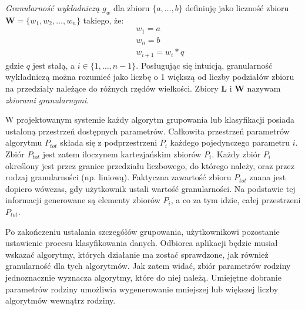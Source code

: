 \documentclass[../thesis.tex]{subfiles}
\begin{document}
\textit{Granularność wykładniczą} $g_w$ dla zbioru $\{a, \ldots, b\}$ definiuję jako liczność zbioru $\textbf{W} = \{w_1, w_2, \ldots, w_n\}$ takiego, że:
\begin{eqnarray*}
&& w_1 = a \\
&& w_n = b \\
&& w_{i+1} = w_i * q
\end{eqnarray*}
gdzie $q$ jest stałą, a $i \in \{1, \ldots, n-1\}$. Posługując się intuicją, granularność wykładniczą można rozumieć jako liczbę o 1 większą od liczby podziałów zbioru na przedziały należące do różnych rzędów wielkości. Zbiory $\textbf{L}$ i $\textbf{W}$ nazywam \textit{zbiorami granularnymi}.

W projektowanym systemie każdy algorytm grupowania lub klasyfikacji posiada ustaloną przestrzeń dostępnych parametrów. Całkowita przestrzeń parametrów algorytmu $P_{tot}$ składa się z podprzestrzeni $P_i$ każdego pojedynczego parametru $i$. Zbiór $P_{tot}$ jest zatem iloczynem kartezjańskim zbiorów $P_i$. Każdy zbiór $P_i$ określony jest przez granice przedziału liczbowego, do którego należy, oraz przez rodzaj granularności (np. liniową). Faktyczna zawartość zbioru $P_{tot}$ znana jest dopiero wówczas, gdy użytkownik ustali wartość granularności. Na podstawie tej informacji generowane są elementy zbiorów $P_i$, a co za tym idzie, całej przestrzeni $P_{tot}$.

Po zakończeniu ustalania szczegółów grupowania, użytkownikowi pozostanie ustawienie procesu klasyfikowania danych. Odbiorca aplikacji będzie musiał wskazać algorytmy, których działanie ma zostać sprawdzone, jak również granularność dla tych algorytmów. Jak zatem widać, zbiór parametrów rodziny jednoznacznie wyznacza algorytmy, które do niej należą. Umiejętne dobranie parametrów rodziny umożliwia wygenerowanie mniejszej lub większej liczby algorytmów wewnątrz rodziny.
\end{document}
